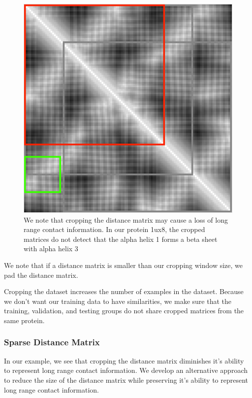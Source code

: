 \documentclass[12pt, a4paper, twocolumn, fullpage]{article}
\theoremstyle{plain}
\theoremstyle{definition}
\theoremstyle{remark}
\begin{document}
\begin{figure}[h]
    \centering
    \includegraphics[width=\linewidth]{cropMatMiss}
    \caption{We note that cropping the distance matrix may cause a loss of long range contact information. In our protein 1ux8, the cropped matrices do not detect that the alpha helix 1 forms a beta sheet with alpha helix 3}
    \label{cropMatMiss}
\end{figure}

We note that if a distance matrix is smaller than our cropping window size, we pad the distance matrix.

Cropping the dataset increases the number of examples in the dataset. Because we don't want our training data to have similarities, we make sure that the training, validation, and testing groups do not share cropped matrices from the same protein.
\subsubsection{ Sparse Distance Matrix}
In our example, we see that cropping the distance matrix diminishes it's ability to represent long range contact information. We develop an alternative approach to reduce the size of the distance matrix while preserving it's ability to represent long range contact information.
\end{document}
